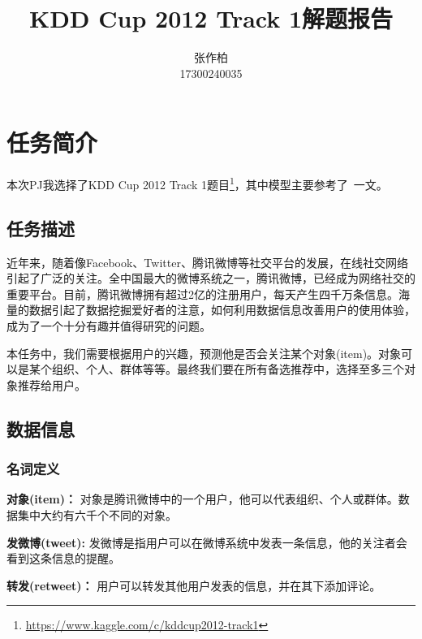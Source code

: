 \documentclass[12pt]{article} %
\title{\textbf{KDD Cup 2012 Track 1解题报告}}
\author{张作柏\\17300240035}
\begin{document}
\begin{sloppypar}
\maketitle

\pagestyle{fancy}
\lhead{\textbf{{\thetitle}}}
\rhead{\textbf{\nouppercase{\firstleftmark}}}
\cfoot{\thepage}

\thispagestyle{empty}
\tableofcontents
\clearpage

\setcounter{page}{1}


\section{任务简介}

本次PJ我选择了KDD Cup 2012 Track 1题目\footnote{\url{https://www.kaggle.com/c/kddcup2012-track1}}，其中模型主要参考了~\cite{}一文。

\subsection{任务描述}

近年来，随着像Facebook、Twitter、腾讯微博等社交平台的发展，在线社交网络引起了广泛的关注。全中国最大的微博系统之一，腾讯微博，已经成为网络社交的重要平台。目前，腾讯微博拥有超过2亿的注册用户，每天产生四千万条信息。海量的数据引起了数据挖掘爱好者的注意，如何利用数据信息改善用户的使用体验，成为了一个十分有趣并值得研究的问题。

本任务中，我们需要根据用户的兴趣，预测他是否会关注某个对象(item)。对象可以是某个组织、个人、群体等等。最终我们要在所有备选推荐中，选择至多三个对象推荐给用户。

\subsection{数据信息}

\subsubsection{名词定义}

{\bf 对象(item)：} 对象是腾讯微博中的一个用户，他可以代表组织、个人或群体。数据集中大约有六千个不同的对象。

{\bf 发微博(tweet):} 发微博是指用户可以在微博系统中发表一条信息，他的关注者会看到这条信息的提醒。

{\bf 转发(retweet)：} 用户可以转发其他用户发表的信息，并在其下添加评论。


\end{sloppypar}
\end{document}
